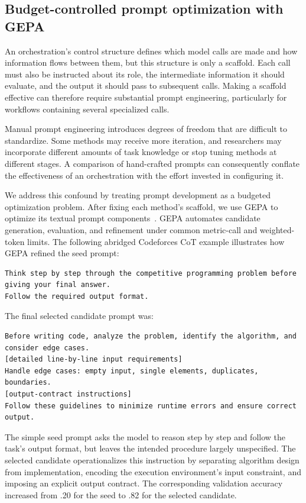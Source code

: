 \documentclass[a4paper]{article}
\theoremstyle{plain}
\theoremstyle{definition}
\theoremstyle{remark}
\begin{document}
\subsection{Budget-controlled prompt optimization with GEPA}
\label{sec:gepa}

An orchestration's control structure defines which model calls are made and how information flows between them, but this structure is only a scaffold.
Each call must also be instructed about its role, the intermediate information it should evaluate, and the output it should pass to subsequent calls.
Making a scaffold effective can therefore require substantial prompt engineering, particularly for workflows containing several specialized calls.

Manual prompt engineering introduces degrees of freedom that are difficult to standardize.
Some methods may receive more iteration, and researchers may incorporate different amounts of task knowledge or stop tuning methods at different stages.
A comparison of hand-crafted prompts can consequently conflate the effectiveness of an orchestration with the effort invested in configuring it.

We address this confound by treating prompt development as a budgeted optimization problem.
After fixing each method's scaffold, we use GEPA to optimize its textual prompt components~\citep{agrawal_gepa_2026}.
GEPA automates candidate generation, evaluation, and refinement under common metric-call and weighted-token limits.
The following abridged Codeforces CoT example illustrates how GEPA refined the seed prompt:

\begin{lstlisting}[style=feedbackprompt]
Think step by step through the competitive programming problem before giving your final answer.
Follow the required output format.
\end{lstlisting}

The final selected candidate prompt was:

\begin{lstlisting}[style=feedbackprompt]
Before writing code, analyze the problem, identify the algorithm, and consider edge cases.
[detailed line-by-line input requirements]
Handle edge cases: empty input, single elements, duplicates, boundaries.
[output-contract instructions]
Follow these guidelines to minimize runtime errors and ensure correct output.
\end{lstlisting}

The simple seed prompt asks the model to reason step by step and follow the task's output format, but leaves the intended procedure largely unspecified.
The selected candidate operationalizes this instruction by separating algorithm design from implementation, encoding the execution environment's input constraint, and imposing an explicit output contract.
The corresponding validation accuracy increased from .20 for the seed to .82 for the selected candidate.
\end{document}
